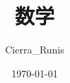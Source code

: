 \documentclass[
  UTF8, openany, 10pt,
  a4paper, oneside, fontset=none
]{ctexbook}
\title{{\Huge{\textbf{数学}}}}
\author{Cierra\_Runis}
\date{\today}
\begin{document}
  \frontmatter
  \maketitle
  

  \mainmatter
  \hypertarget{footlinkcontent}{}
  \tableofcontents
  

  \backmatter
  
\end{document}
